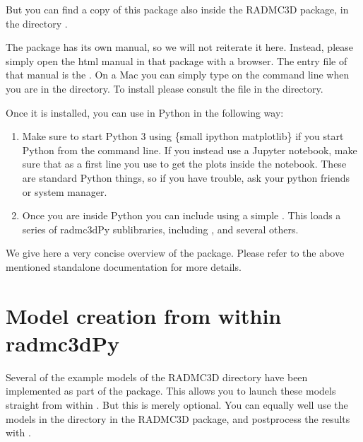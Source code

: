 \documentclass[letterpaper,10pt,english]{sphinxmanual}
\begin{document}

But you can find a copy of this package also inside the RADMC\sphinxhyphen{}3D package,
in the directory .

The  package has its own manual, so we will not reiterate it
here. Instead, please simply open the html manual in that package with a
browser. The entry file of that manual is the .  On a
Mac you can simply type  on the command line when you
are in the  directory. To install  please consult the
 file in the  directory.

Once it is installed, you can use  in Python in the following
way:
\begin{enumerate}
%
\item {} 
Make sure to start Python 3 using \{small ipython \textendash{}matplotlib\} if you start
Python from the command line. If you instead use a Jupyter notebook, make
sure that as a first line you use  to get the plots
inside the notebook. These are standard Python things, so if you have
trouble, ask your python friends or system manager.

\item {} 
Once you are inside Python you can include  using a simple
. This loads a series of radmc3dPy sub\sphinxhyphen{}libraries,
including ,  and several others.

\end{enumerate}

We give here a very concise overview of the  package.
Please refer to the above mentioned stand\sphinxhyphen{}alone documentation for more details.


\section{Model creation from within radmc3dPy}
\label{\detokenize{pythontools:model-creation-from-within-radmc3dpy}}
Several of the example models of the RADMC\sphinxhyphen{}3D  directory have been
implemented as part of the  package. This allows you to launch
these models straight from within . But this is merely
optional. You can equally well use the models in the  directory in
the RADMC\sphinxhyphen{}3D package, and post\sphinxhyphen{}process the results with .
\end{document}
